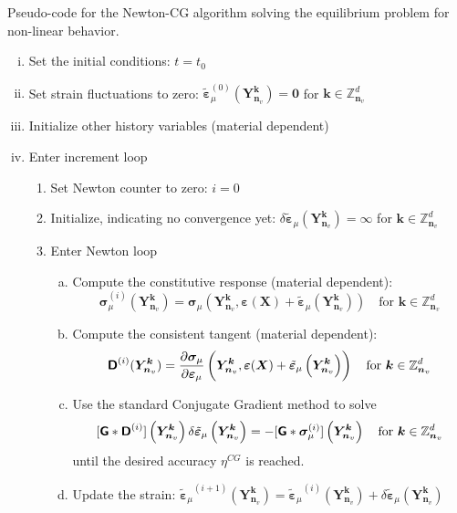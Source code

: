 \begin{framedbox}[htb]
\caption{Pseudo-code for the Newton-CG algorithm solving the equilibrium problem for non-linear behavior.}
\label{box:alg_newton_cg}
\begin{center}
\begin{minipage}{0.9\textwidth}
\begin{enumerate}[(i)]
\item Set the initial conditions: \(t=t_0\)
\item Set strain fluctuations to zero: \(\tilde{\bm \varepsilon}_\mu^{(0)}(\bm Y^{\bm k}_{\bm n_v})=\bm{0}\) for \(\bm  k \in \mathbb{Z}_{\bm n_v}^{d}\)
\item Initialize other history variables (material dependent)
\item Enter increment loop
\begin{enumerate}[(1)]
  \item Set Newton counter to zero: \(i=0\)
  \item Initialize, indicating no convergence yet: \(\delta \tilde{\bm\varepsilon}_\mu(\bm Y^{\bm k}_{\bm n_v})={\bm \infty}\) for \(\bm  k \in \mathbb{Z}_{\bm n_v}^{d}\)
  \item Enter Newton loop
  \begin{enumerate}[(a)]
    \item Compute the constitutive response (material dependent): \[\bm{\sigma}_\mu^{(i)}(\bm Y^{\bm k}_{\bm n_v})={\bm{\sigma}_\mu}\left(\bm{Y}_{\bm n_v}^{\bm  k}, \bm \varepsilon(\bm X)+\tilde{\bm \varepsilon}_\mu \left(\bm Y_{\bm n_v}^{\bm  k}\right)\right)\quad\text{for \(\bm  k \in \mathbb{Z}_{\bm n_v}^{d}\)}\]
    \item Compute the consistent tangent (material dependent):
    \[{\boldsymbol{\mathsf{D}}}^{(i)}(\bm Y^{\bm k}_{\bm n_v})=\frac{\partial \bm{\sigma}_\mu}{\partial \bm\varepsilon_\mu}\left(\bm{Y}_{\bm n_v}^{\bm  k}, \bm \varepsilon(\bm X)+\tilde{\bm \varepsilon}_\mu \left(\bm Y_{\bm n_v}^{\bm  k}\right)\right)\quad\text{for \(\bm  k \in \mathbb{Z}_{\bm n_v}^{d}\)}\]
    \item Use the standard Conjugate Gradient method to solve
    \[
[\boldsymbol{\mathsf{G}} * \boldsymbol{\mathsf{D}}^{(i)}]\left(\bm{Y}_{\bm n_v}^{\bm  k}\right)\delta \tilde{\bm\varepsilon}_{\mu}\left(\bm{Y}_{\bm n_v}^{\bm  k}\right) = -[\boldsymbol{\mathsf{G}} * \bm\sigma_\mu^{(i)}]\left(\bm{Y}_{\bm n_v}^{\bm  k}\right)\quad \text{for \(\bm k \in \mathbb Z^d_{\bm n_v}\)}
\]
until the desired accuracy \(\eta^{CG}\) is reached.
  \item Update the strain: \({\tilde{\bm\varepsilon}_\mu}^{(i+1)}\left(\bm{Y}_{\bm n_v}^{\bm  k}\right)={\tilde{\bm\varepsilon}_\mu}^{(i)}\left(\bm{Y}_{\bm n_v}^{\bm  k}\right)+\delta {\tilde{\bm\varepsilon}_\mu}\left(\bm{Y}_{\bm n_v}^{\bm  k}\right)\)

\end{enumerate}
\end{enumerate}
\end{enumerate}
\end{minipage}
\end{center}
\end{framedbox}
